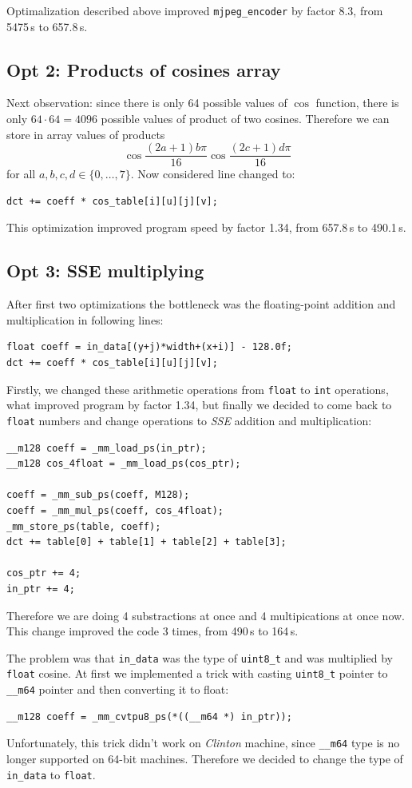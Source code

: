\documentclass[11pt]{article}
\begin{document}
Optimalization described above improved \texttt{mjpeg\_encoder} by factor 8.3, from 5475\,s to 657.8\,s.

\subsection{Opt 2: Products of cosines array}
Next observation: since there is only 64 possible values of $\cos$ function,
there is only $64 \cdot 64 = 4096$ possible values of product of two cosines.
Therefore we can store in array values of products
$$\cos \frac{(2a + 1) b \pi}{16}
\cos \frac{(2c + 1) d \pi}{16}$$
for all $a, b, c, d \in \{0, \ldots, 7 \}$.
Now considered line changed to:
\begin{lstlisting}
dct += coeff * cos_table[i][u][j][v];
\end{lstlisting}
This optimization improved program speed by factor 1.34, from 657.8\,s to 490.1\,s.

\subsection{Opt 3: SSE multiplying}
After first two optimizations the bottleneck was the floating-point addition and multiplication in following lines:
\begin{lstlisting}
float coeff = in_data[(y+j)*width+(x+i)] - 128.0f;
dct += coeff * cos_table[i][u][j][v];
\end{lstlisting}
Firstly, we changed these arithmetic operations from \texttt{float} to \texttt{int} operations, what improved program by factor 1.34, 
but finally we decided to come back to \texttt{float} numbers and change operations to \emph{SSE} addition and multiplication:
\begin{lstlisting}
__m128 coeff = _mm_load_ps(in_ptr);
__m128 cos_4float = _mm_load_ps(cos_ptr);

coeff = _mm_sub_ps(coeff, M128);
coeff = _mm_mul_ps(coeff, cos_4float);
_mm_store_ps(table, coeff);
dct += table[0] + table[1] + table[2] + table[3];

cos_ptr += 4;
in_ptr += 4;
\end{lstlisting}
Therefore we are doing 4 substractions at once and 4 multipications at once now.
This change improved the code 3 times, from 490\,s to 164\,s.

The problem was that \texttt{in\_data} was the type of \texttt{uint8\_t}
and was multiplied by \texttt{float} cosine.
At first we implemented a trick with casting \texttt{uint8\_t} pointer
to \texttt{\_\_m64} pointer and then converting it to float:
\begin{lstlisting}
__m128 coeff = _mm_cvtpu8_ps(*((__m64 *) in_ptr));
\end{lstlisting}
Unfortunately, this trick didn't work on \emph{Clinton} machine, 
since \texttt{\_\_m64} type is no longer supported on 64-bit machines.
Therefore we decided to change the type of \texttt{in\_data} to \texttt{float}.
\end{document}
